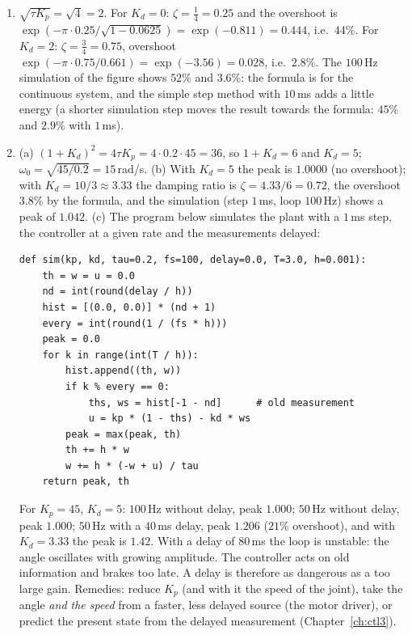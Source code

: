 \begin{enumerate}[label=\textbf{\ansnum.\arabic*}]
\begin{verbatim}
        u = kp * (1.0 - y)
        y += dt * (-y + u) / tau
    print(kp, round(y, 4), round(kp / (1 + kp), 4))
\end{verbatim}
prints \verb!1 0.5 0.5!, \verb!4 0.8 0.8! and \verb!16 0.9412 0.9412!: after $4$\,s ($8\tau$) the simulation has converged to the formula.
  \item $\sqrt{\tau K_p}=\sqrt{4}=2$. For $K_d=0$: $\zeta=\frac{1}{4}=0.25$ and the overshoot is $\exp(-\pi\cdot0.25/\sqrt{1-0.0625})=\exp(-0.811)=0.444$, i.e.\ $44\%$. For $K_d=2$: $\zeta=\frac{3}{4}=0.75$, overshoot $\exp(-\pi\cdot0.75/0.661)=\exp(-3.56)=0.028$, i.e.\ $2.8\%$. The $100$\,Hz simulation of the figure shows $52\%$ and $3.6\%$: the formula is for the continuous system, and the simple step method with $10$\,ms adds a little energy (a shorter simulation step moves the result towards the formula: $45\%$ and $2.9\%$ with $1$\,ms).
  \item (a) $(1+K_d)^2=4\tau K_p=4\cdot0.2\cdot45=36$, so $1+K_d=6$ and $K_d=5$; $\omega_0=\sqrt{45/0.2}=15$\,rad/s. (b) With $K_d=5$ the peak is $1.0000$ (no overshoot); with $K_d=10/3\approx3.33$ the damping ratio is $\zeta=4.33/6=0.72$, the overshoot $3.8\%$ by the formula, and the simulation (step $1$\,ms, loop $100$\,Hz) shows a peak of $1.042$. (c) The program below simulates the plant with a $1$\,ms step, the controller at a given rate and the measurements delayed:
\begin{verbatim}
def sim(kp, kd, tau=0.2, fs=100, delay=0.0, T=3.0, h=0.001):
    th = w = u = 0.0
    nd = int(round(delay / h))
    hist = [(0.0, 0.0)] * (nd + 1)
    every = int(round(1 / (fs * h)))
    peak = 0.0
    for k in range(int(T / h)):
        hist.append((th, w))
        if k % every == 0:
            ths, ws = hist[-1 - nd]      # old measurement
            u = kp * (1 - ths) - kd * ws
        peak = max(peak, th)
        th += h * w
        w += h * (-w + u) / tau
    return peak, th
\end{verbatim}
For $K_p=45$, $K_d=5$: $100$\,Hz without delay, peak $1.000$; $50$\,Hz without delay, peak $1.000$; $50$\,Hz with a $40$\,ms delay, peak $1.206$ ($21\%$ overshoot), and with $K_d=3.33$ the peak is $1.42$. With a delay of $80$\,ms the loop is unstable: the angle oscillates with growing amplitude. The controller acts on old information and brakes too late. A delay is therefore as dangerous as a too large gain. Remedies: reduce $K_p$ (and with it the speed of the joint), take the angle \emph{and the speed} from a faster, less delayed source (the motor driver), or predict the present state from the delayed measurement (Chapter~\ref{ch:ctl3}).
\end{enumerate}

